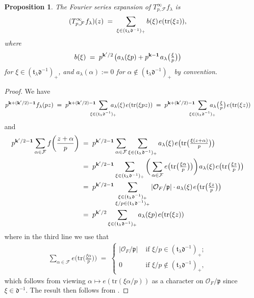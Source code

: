 \documentclass[11pt]{amsart}
\newtheorem{prop}[theorem]{Proposition}
\theoremstyle{remark}
\newcommand\mbf[1]{\mathbf{#1}}
\newcommand\cl[1]{\mathcal{#1}}
\newcommand\fr[1]{\mathfrak{#1}}
\newcommand{\clo}{\mathcal{O}}
\newcommand{\eq}{\;=\;}
\newcommand{\bone}{\mathbf{1}}
\def\thin{{\hskip 1pt}}
\newcommand{\tr}{\mathrm{tr}}
\begin{document}
\begin{prop}
The Fourier series expansion of $T_{p,\cl{F}}^\infty f_\lambda$ is
\begin{align*}
    (T_{p,\cl{F}}^\infty\thin f_\lambda)(z)\eq\sum_{\xi\in(\fr{t}_\lambda\fr{d}^{-1})_+}b(\xi)\thin e(\tr(\xi z)),
\end{align*}
where
\begin{align*}
    b(\xi)\eq p^{\mbf{k}^\prime/2}\thin \big(a_\lambda(\xi p)+p^{\mbf{k}-\bone}\thin a_\lambda\big(\tfrac{\xi}{p}\big)\big)
\end{align*}
for $\xi\in(\fr{t}_\lambda\fr{d}^{-1})_+$, and $a_\lambda(\alpha):=0$ for $\alpha\notin(\fr{t}_\lambda\fr{d}^{-1})_+$ by convention.
\end{prop}
\begin{proof}
We have
\begin{align*}
    p^{\mbf{k}+(\mbf{k}^\prime/2)-\bone}f_\lambda(pz)\eq p^{\mbf{k}+(\mbf{k}^\prime/2)-\bone}\;\sum_{\mathclap{\xi\in(\fr{t}_\lambda\fr{d}^{-1})_+}}\;a_\lambda(\xi)\thin e(\tr(\xi pz))\eq p^{\mbf{k}+(\mbf{k}^\prime/2)-\bone}\;\sum_{\mathclap{\xi\in(\fr{t}_\lambda\fr{d}^{-1})_+}}\;a_\lambda\big(\tfrac{\xi}{p}\big)\thin e(\tr(\xi z))
\end{align*}
and
\begin{align*}
    p^{\mbf{k}^\prime/2-\bone}\sum_{\alpha\in\cl{F}}f\bigg(\frac{z+\alpha}{p}\bigg)&\eq p^{\mbf{k}^\prime/2-\bone}\sum_{\alpha\in\cl{F}}\sum_{\xi\in(\fr{t}_\lambda\fr{d}^{-1})_+}a_\lambda(\xi)\thin e\big(\tr\big(\tfrac{\xi(z+\alpha)}{p}\big)\big) \\
    &\eq p^{\mbf{k}^\prime/2-\bone}\sum_{\xi\in(\fr{t}_\lambda\fr{d}^{-1})_+}\bigg(\sum_{\alpha\in\cl{F}}e\big(\tr\big(\tfrac{\xi \alpha}{p}\big)\big)\bigg)\thin a_\lambda(\xi)\thin e\big(\tr\big(\tfrac{\xi z}{p}\big)\big) \\
    &\eq p^{\mbf{k}^\prime/2-\bone}\sum_{\substack{\xi\in(\fr{t}_\lambda\fr{d}^{-1})_+\\ \xi/p\in(\fr{t}_\lambda\fr{d}^{-1})_+}}|\clo_F/\fr{p}|\cdot a_\lambda(\xi)\thin e\big(\tr\big(\tfrac{\xi z}{p}\big)\big) \\
    &\eq p^{\mbf{k}^\prime/2} \sum_{\xi\in(\fr{t}_\lambda\fr{d}^{-1})_+}a_\lambda(\xi p)\thin e(\tr(\xi z))
\end{align*}
where in the third line we use that
\begin{align*}
    \sum_{\alpha\in\cl{F}}e\big(\tr\big(\tfrac{\xi \alpha}{p}\big)\big)\eq\begin{cases} |\clo_F/\fr{p}|&\text{ if }\xi/p\in(\fr{t}_\lambda\fr{d}^{-1})_+; \\ 0&\text{ if }\xi/p\notin(\fr{t}_\lambda\fr{d}^{-1})_+, 
    \end{cases}
\end{align*}
which follows from viewing $\alpha\mapsto e(\tr(\xi\alpha/p))$ as a character on $\clo_F/\fr{p}$ since $\xi\in\fr{d}^{-1}$. The result then follows from .
\end{proof}
\end{document}
